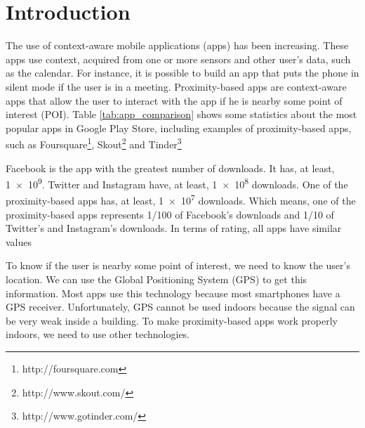 
%
%

\section{Introduction}
\label{sec:introduction}


The use of context-aware mobile applications (apps)
has been increasing.
These apps use context, acquired
from one or more sensors and other user's data, 
such as the calendar. For instance, it is possible to
build an app that puts the phone in silent mode if the
user is in a meeting. Proximity-based apps are
context-aware apps that allow the user to interact
with the app if he is nearby some point of interest (POI).
Table \ref{tab:app_comparison} shows some statistics
about the most popular apps in Google Play Store,
including examples of proximity-based apps,
such as Foursquare\footnote{http://foursquare.com},
Skout\footnote{http://www.skout.com/} and
Tinder\footnote{http://www.gotinder.com/}



Facebook is the app with the
greatest number of downloads.
It has, at least, \num{1e9}. Twitter and Instagram
have, at least, \num{1e8} downloads.
One of the 
proximity-based apps has, at least, \num{1e7} downloads.
Which means, one of
the proximity-based apps represents
1/100 of Facebook's downloads and 1/10 of Twitter's
and Instagram's downloads. In terms of rating, all apps
have similar values

To know if the user is nearby some point of interest,
we need to know the user's location. We can use 
the Global Positioning System 
(GPS)\cite{masumoto1993global} to
get this information. Most apps use this technology 
because most smartphones have a GPS receiver. 
Unfortunately, GPS cannot be used indoors because 
the signal can
be very weak inside a building. To make proximity-based
apps work properly indoors, we need to use other 
technologies.

